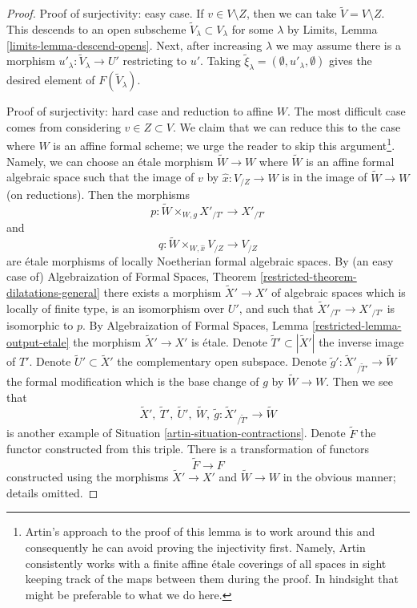 \begin{proof}
\medskip\noindent
Proof of surjectivity: easy case.
If $v \in V \setminus Z$, then we can take $\tilde V = V \setminus Z$.
This descends to an open subscheme $\tilde V_\lambda \subset V_\lambda$
for some $\lambda$ by Limits, Lemma
\ref{limits-lemma-descend-opens}.
Next, after increasing $\lambda$ we may assume
there is a morphism $u'_\lambda : \tilde V_\lambda \to U'$
restricting to $u'$. Taking
$\tilde \xi_\lambda = (\emptyset, u'_\lambda, \emptyset)$
gives the desired element of $F(\tilde V_\lambda)$.

\medskip\noindent
Proof of surjectivity: hard case and reduction to affine $W$.
The most difficult case comes from considering $v \in Z \subset V$.
We claim that we can reduce this to the case where $W$ is an
affine formal scheme; we urge the reader to skip this argument\footnote{Artin's
approach to the proof of this lemma is to work around this and
consequently he can avoid proving the injectivity first. Namely, Artin
consistently works with a finite affine \'etale coverings of all spaces
in sight keeping track of the maps between them during the proof.
In hindsight that might be preferable to what we do here.}.
Namely, we can choose an \'etale morphism
$\tilde W \to W$ where $\tilde W$ is an affine formal algebraic space
such that the image of $v$ by $\hat x : V_{/Z} \to W$ is
in the image of $\tilde W \to W$ (on reductions).
Then the morphisms
$$
p : \tilde W \times_{W, g} X'_{/T'} \longrightarrow X'_{/T'}
$$
and
$$
q : \tilde W \times_{W, \hat x} V_{/Z} \to V_{/Z}
$$
are \'etale morphisms of locally Noetherian formal algebraic spaces.
By (an easy case of) Algebraization of Formal Spaces, Theorem
\ref{restricted-theorem-dilatations-general}
there exists a morphism $\tilde X' \to X'$ of algebraic spaces
which is locally of finite type, is an isomorphism over $U'$, and
such that $\tilde X'_{/T'} \to X'_{/T'}$ is isomorphic to $p$.
By Algebraization of Formal Spaces, Lemma \ref{restricted-lemma-output-etale}
the morphism $\tilde X' \to X'$ is \'etale. Denote
$\tilde T' \subset |\tilde X'|$ the inverse image of $T'$.
Denote $\tilde U' \subset \tilde X'$ the complementary open subspace.
Denote $\tilde g' : \tilde X'_{/\tilde T'} \to \tilde W$
the formal modification which is the base change of $g$ by
$\tilde W \to W$. Then we see that
$$
\tilde X',\ \tilde T',\ \tilde U',\ \tilde W,
\ \tilde g : \tilde X'_{/\tilde T'} \to \tilde W
$$
is another example of Situation \ref{artin-situation-contractions}.
Denote $\tilde F$ the functor constructed from this triple.
There is a transformation of functors
$$
\tilde F \longrightarrow F
$$
constructed using the morphisms $\tilde X' \to X'$ and
$\tilde W \to W$ in the obvious manner; details omitted.


\end{proof}
